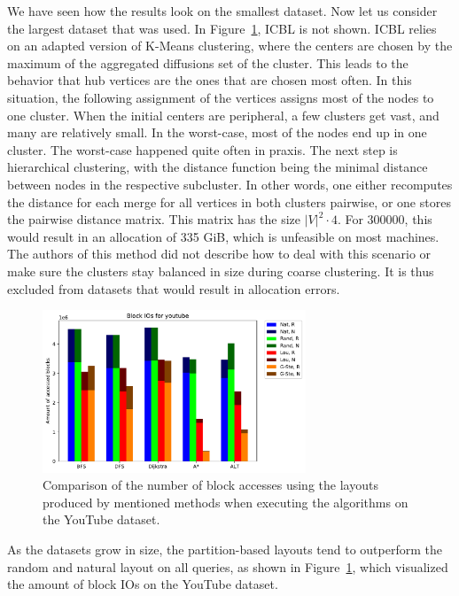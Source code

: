     We have seen how the results look on the smallest dataset. Now let us consider the largest dataset that was used.
    In Figure~\ref{yt-b}, ICBL is not shown.
    ICBL relies on an adapted version of K-Means clustering, where the centers are chosen by the maximum of the aggregated diffusions set of the cluster. 
    This leads to the behavior that hub vertices are the ones that are chosen most often.
In this situation, the following assignment of the vertices assigns most of the nodes to one cluster. When the initial centers are peripheral, a few clusters get vast, and many are relatively small. In the worst-case, most of the nodes end up in one cluster. The worst-case happened quite often in praxis. The next step is hierarchical clustering, with the distance function being the minimal distance between nodes in the respective subcluster. In other words, one either recomputes the distance for each merge for all vertices in both clusters pairwise, or one stores the pairwise distance matrix.
    This matrix has the size $|V|^2 \cdot 4$. For $300000$, this would result in an allocation of 335 GiB, which is unfeasible on most machines.
    The authors of this method did not describe how to deal with this scenario or make sure the clusters stay balanced in size during coarse clustering. It is thus excluded from datasets that would result in allocation errors.
    
    \begin{figure}[htp]
        \begin{center}
            \includegraphics[keepaspectratio,width=0.7\textwidth]{img/07-eval/youtube_Block_unsorted_io_comparison.pdf}
        \end{center}
        \caption{Comparison of the number of block accesses using the layouts produced by mentioned methods when executing the algorithms on the YouTube dataset.}
        \label{yt-b}
    \end{figure}
    
    
    As the datasets grow in size, the partition-based layouts tend to outperform the random and natural layout on all queries, as shown in Figure~\ref{yt-b}, which visualized the amount of block IOs on the YouTube dataset.    

